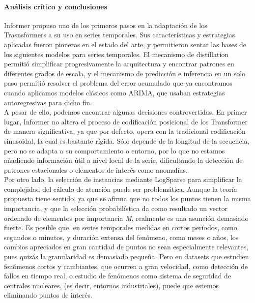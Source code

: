 \paragraph{Análisis crítico y conclusiones}

Informer propuso uno de los primeros pasos en la adaptación de los Trasnsformers a su uso en series temporales. Sus características y estrategias aplicadas fueron pioneras en el estado del arte, y permitieron sentar las bases de los siguientes modelos para series temporales. El mecanismo de distillation permitió simplificar progresivamente la arquitectura y encontrar patrones en diferentes grados de escala, y el mecanismo de predicción e inferencia en un solo paso permitió resolver el problema del error acumulado que ya encontramos cuando aplicamos modelos clásicos como ARIMA, que usaban estrategias autoregresivas para dicho fin.\\

A pesar de ello, podemos encontrar algunas decisiones controvertidas. En primer lugar, Informer no altera el proceso de codificación posicional de los Transformer de manera significativa, ya que por defecto, opera con la tradicional codificación sinusoidal, la cual es bastante rígida. Sólo depende de la longitud de la secuencia, pero no se adapta a su comportamiento o entorno, por lo que no estamos añadiendo información útil a nivel local de la serie, dificultando la detección de patrones estacionales o elementos de interés como anomalías.\\

Por otro lado, la selección de instancias mediante LogSparse para simplificar la complejidad del cálculo de atención puede ser problemática. Aunque la teoría propuesta tiene sentido, ya que se afirma que no todos los puntos tienen la misma importancia, y que la selección probabilística da como resultado un vector ordenado de elementos por importancia \textit{M}, realmente es una asunción demasiado fuerte. Es posible que, en series temporales medidas en cortos períodos, como segundos o minutos, y duración extensa del fenómeno, como meses o años, los cambios apreciados en gran cantidad de puntos no sean especialmente relevantes, pues quizás la granularidad es demasiado pequeña. Pero en datasets que estudien fenómenos cortos y cambiantes, que ocurren a gran velocidad, como detección de fallos en tiempo real, o estudio de fenómenos como sistema de seguridad de centrales nucleares, (es decir, entornos industriales), puede que estemos eliminando puntos de interés.\\

